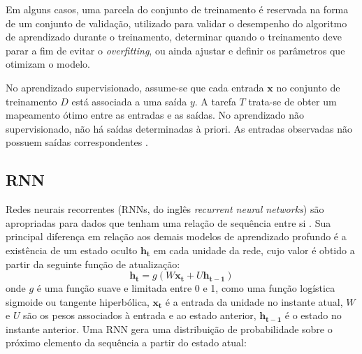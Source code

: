 Em alguns casos, uma parcela do conjunto de treinamento é reservada na forma de
um conjunto de validação, utilizado para validar o desempenho do algoritmo de
aprendizado durante o treinamento, determinar quando o treinamento deve parar a
fim de evitar o \textit{overfitting}, ou ainda ajustar e definir os parâmetros
que otimizam o modelo.

No aprendizado supervisionado, assume-se que cada entrada $\mathbf{x}$ no
conjunto de treinamento $D$ está associada a uma saída $y$. A tarefa $T$
trata-se de obter um mapeamento ótimo entre as entradas e as saídas. No
aprendizado não supervisionado, não há saídas determinadas à priori. As entradas
observadas não possuem saídas correspondentes \cite{pml1Book}.

\subsection{RNN}
Redes neurais recorrentes (RNNs, do inglês \textit{recurrent neural networks})
 são apropriadas para dados que tenham uma relação de sequência entre si
 \cite{gru4rec_1}. Sua principal diferença em relação aos demais modelos de
 aprendizado profundo é a existência de um estado oculto $\mathbf{h_t}$ em
 cada unidade da rede, cujo valor é obtido a partir da seguinte função de
 atualização:
\begin{equation}
    \mathbf{h_t} = g(W\mathbf{x_t} + U\mathbf{h_{t-1}})
\end{equation}
onde $g$ é uma função suave e limitada entre 0 e 1, como uma função logística
sigmoide ou tangente hiperbólica, $\mathbf{x_t}$ é a entrada da unidade no
instante atual, $W$ e $U$ são os pesos associados à entrada e ao estado
anterior, $\mathbf{h_{t-1}}$ é o estado no instante anterior. Uma RNN gera uma
distribuição de probabilidade sobre o próximo elemento da sequência a partir do
estado atual:

